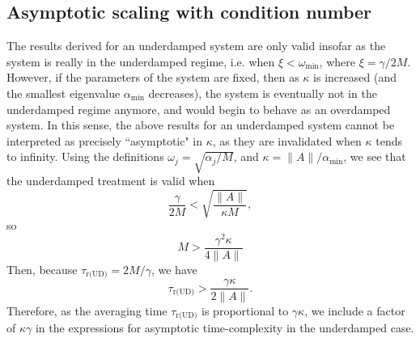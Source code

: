 \documentclass[prx,onecolumn,floatfix,longbibliography,notitlepage, nofootinbib]{revtex4-1}
\begin{document}
\begin{appendix}
\subsection{Asymptotic scaling with condition  number}
The results derived for an underdamped system are only valid insofar as the system is really in the underdamped regime, i.e. when $\xi < \omega_\text{min}$, where $\xi = \gamma/ 2M$. However, if the parameters of the system are fixed,  then as $\kappa$ is increased (and the smallest eigenvalue $\alpha_\text{min}$ decreases), the system is eventually not in the underdamped regime anymore, and would begin to behave as an overdamped system. In this sense, the above results for an underdamped system cannot be interpreted as precisely ``asymptotic" in $\kappa$, as they are invalidated when $\kappa$ tends to infinity. Using the definitions $\omega_j = \sqrt{\alpha_j/M}$, and $\kappa = \|A\|/\alpha_\text{min}$, we see that the underdamped treatment is valid when
\begin{equation}
    \frac{\gamma}{2M}< \sqrt{\frac{\|A\|}{\kappa M}},
\end{equation}
so
\begin{equation}
    M > \frac{\gamma^2 \kappa}{4\|A\|}
\end{equation}
Then, because $\tau_\text{r(UD)} = 2 M / \gamma$, we have
\begin{equation}
    \tau_\text{r(UD)}>   \frac{\gamma \kappa}{2\|A\|}.
\end{equation}
Therefore, as the averaging time $\tau_\text{r(UD)}$ is proportional to $\gamma \kappa$, we include a factor of $\kappa \gamma$ in the expressions for asymptotic time-complexity in the underdamped case.

\end{appendix}
\end{document}
